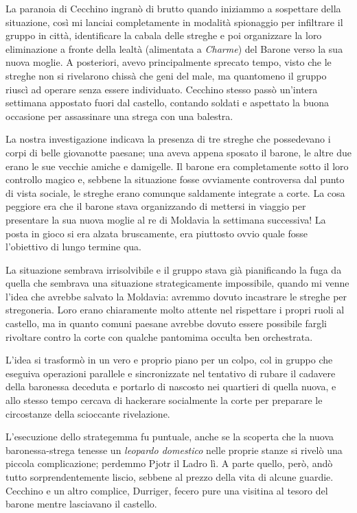 La paranoia di Cecchino ingranò di brutto quando iniziammo a sospettare della situazione, così mi lanciai completamente in modalità spionaggio per infiltrare il gruppo in città, identificare la cabala delle streghe e poi organizzare la loro eliminazione a fronte della lealtà (alimentata a \textit{Charme}) del Barone verso la sua nuova moglie. A posteriori, avevo principalmente sprecato tempo, visto che le streghe non si rivelarono chissà che geni del male, ma quantomeno il gruppo riuscì ad operare senza essere individuato. Cecchino stesso passò un'intera settimana appostato fuori dal castello, contando soldati e aspettato la buona occasione per assassinare una strega con una balestra.

La nostra investigazione indicava la presenza di tre streghe che possedevano i corpi di belle giovanotte paesane; una aveva appena sposato il barone, le altre due erano le sue vecchie amiche e damigelle. Il barone era completamente sotto il loro controllo magico e, sebbene la situazione fosse ovviamente controversa dal punto di vista sociale, le streghe erano comunque saldamente integrate a corte. La cosa peggiore era che il barone stava organizzando di mettersi in viaggio per presentare la sua nuova moglie al re di Moldavia la settimana successiva! La posta in gioco si era alzata bruscamente, era piuttosto ovvio quale fosse l'obiettivo di lungo termine qua.

La situazione sembrava irrisolvibile e il gruppo stava già pianificando la fuga da quella che sembrava una situazione strategicamente impossibile, quando mi venne l'idea che avrebbe salvato la Moldavia: avremmo dovuto incastrare le streghe per stregoneria. Loro erano chiaramente molto attente nel rispettare i propri ruoli al castello, ma in quanto comuni paesane avrebbe dovuto essere possibile fargli rivoltare contro la corte con qualche pantomima occulta ben orchestrata.

L'idea si trasformò in un vero e proprio piano per un colpo, col in gruppo che eseguiva operazioni parallele e sincronizzate nel tentativo di rubare il cadavere della baronessa deceduta e portarlo di nascosto nei quartieri di quella nuova, e allo stesso tempo cercava di hackerare socialmente la corte per preparare le circostanze della scioccante rivelazione.

L'esecuzione dello strategemma fu puntuale, anche se la scoperta che la nuova baronessa-strega tenesse un \textit{leopardo domestico} nelle proprie stanze si rivelò una piccola complicazione; perdemmo Pjotr il Ladro lì. A parte quello, però, andò tutto sorprendentemente liscio, sebbene al prezzo della vita di alcune guardie. Cecchino e un altro complice, Durriger, fecero pure una visitina al tesoro del barone mentre lasciavano il castello.

